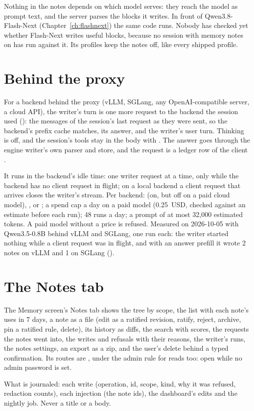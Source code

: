 Nothing in the notes depends on which model serves: they reach the model as prompt text, and the server parses the blocks it writes. In front of Qwen3.8-Flash-Next (Chapter~\ref{ch:flashnext}) the same code runs. Nobody has checked yet whether Flash-Next writes useful blocks, because no session with memory notes on has run against it. Its profiles keep the notes off, like every shipped profile.

\section{Behind the proxy}

For a backend behind the proxy (vLLM, SGLang, any OpenAI-compatible server, a cloud API), the writer's turn is one more request to the backend the session used (): the messages of the session's last request as they were sent, so the backend's prefix cache matches, its answer, and the writer's user turn. Thinking is off, and the session's tools stay in the body with . The answer goes through the engine writer's own parser and store, and the request is a ledger row of the client .

It runs in the backend's idle time: one writer request at a time, only while the backend has no client request in flight; on a local backend a client request that arrives closes the writer's stream. Per backend:   (on, but off on a paid cloud model), ,  or ; a spend cap a day on a paid model (0.25~USD, checked against an estimate before each run); 48 runs a day; a prompt of at most 32,000 estimated tokens. A paid model without a price is refused. Measured on 2026-10-05 with Qwen3.5-0.8B behind vLLM and SGLang, one run each: the writer started nothing while a client request was in flight, and with an answer prefill it wrote 2 notes on vLLM and 1 on SGLang (\measured).

\section{The Notes tab}

The Memory screen's Notes tab shows the tree by scope, the list with each note's uses in 7 days, a note as a file (edit as a ratified revision, ratify, reject, archive, pin a ratified rule, delete), its history as diffs, the search with scores, the requests the notes went into, the writes and refusals with their reasons, the writer's runs, the notes settings, an export as a zip, and the user's delete behind a typed confirmation. Its routes are , under the admin rule for reads too: open while no admin password is set.

What is journaled: each write (operation, id, scope, kind, why it was refused, redaction counts), each injection (the note ids), the dashboard's edits and the nightly job. Never a title or a body.
